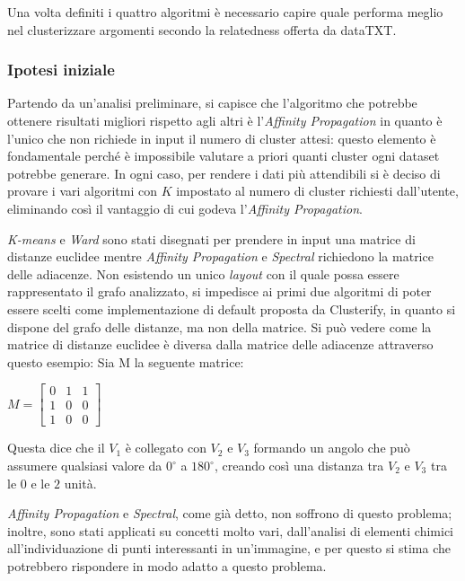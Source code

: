 Una volta definiti i quattro algoritmi è necessario capire quale performa meglio nel clusterizzare argomenti secondo la relatedness offerta da dataTXT.

\subsubsection{Ipotesi iniziale}
Partendo da un'analisi preliminare, si capisce che l'algoritmo che potrebbe ottenere risultati migliori rispetto agli altri è l'\emph{Affinity Propagation} in quanto è l'unico che non richiede in input il numero di cluster attesi: questo elemento è fondamentale perché è impossibile valutare a priori quanti cluster ogni dataset potrebbe generare. In ogni caso, per rendere i dati più attendibili si è deciso di provare i vari algoritmi con $K$ impostato al numero di cluster richiesti dall'utente, eliminando così il vantaggio di cui godeva l'\emph{Affinity Propagation}.

\emph{K-means} e \emph{Ward} sono stati disegnati per prendere in input una matrice di distanze euclidee mentre \emph{Affinity Propagation} e \emph{Spectral} richiedono la matrice delle adiacenze. Non esistendo un unico \emph{layout} con il quale possa essere rappresentato il grafo analizzato, si impedisce ai primi due algoritmi di poter essere scelti come implementazione di default proposta da Clusterify, in quanto si dispone del grafo delle distanze, ma non della matrice. Si può vedere come la matrice di distanze euclidee è diversa dalla matrice delle adiacenze attraverso questo esempio: Sia M la seguente matrice:

\begin{center}
     $M = \begin{bmatrix}
                0 & 1 & 1\\
                1 & 0 & 0\\
                1 & 0 & 0
        \end{bmatrix}$
\end{center}
Questa dice che il $V_1$ è collegato con $V_2$ e $V_3$ formando un angolo che può assumere qualsiasi valore da $0^{\circ}$ a $180^{\circ}$, creando così una distanza tra $V_2$ e $V_3$ tra le $0$ e le $2$ unità.
 
\emph{Affinity Propagation} e \emph{Spectral}, come già detto, non soffrono di questo problema; inoltre, sono stati applicati su concetti molto vari, dall'analisi di elementi chimici all'individuazione di punti interessanti in un'immagine, e per questo si stima che potrebbero rispondere in modo adatto a questo problema.

